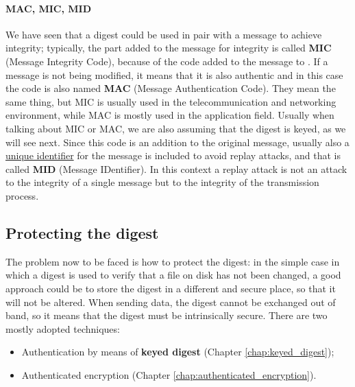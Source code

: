 \paragraph*{MAC, MIC, MID}
We have seen that a digest could be used in pair with a message to achieve integrity; typically, the part added
to the message for integrity is called \textbf{MIC} (Message Integrity Code), because of the code added to the message
to . If a message is not being modified, it means that it is also authentic and in this case the code is also named \textbf{MAC} (Message Authentication Code). They mean the same thing, but MIC is usually used
in the telecommunication and networking environment, while MAC is mostly used in the application field.
Usually when talking about MIC or MAC, we are also assuming that the digest is keyed, as we will see next.
Since this code is an addition to the original message, usually also a \underline{unique identifier} for the message is
included to avoid replay attacks, and that is called \textbf{MID} (Message IDentifier). In this context a replay attack
is not an attack to the integrity of a single message but to the integrity of the transmission process.


\subsection{Protecting the digest}
The problem now to be faced is how to protect the digest: in the simple case in which a digest is used to verify
that a file on disk has not been changed, a good approach could be to store the digest in a different and secure
place, so that it will not be altered. When sending data, the digest cannot be exchanged out of band, so it means
that the digest must be intrinsically secure. There are two mostly adopted techniques:
\begin{itemize}
    \item Authentication by means of \textbf{keyed digest} (Chapter \ref{chap:keyed_digest});
    \item Authenticated encryption (Chapter \ref{chap:authenticated_encryption}).
\end{itemize}

